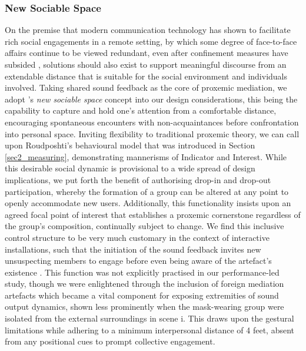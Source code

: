 \subsubsection{New Sociable Space}
On the premise that modern communication technology has shown to facilitate rich social engagements in a remote setting, by which some degree of face-to-face affairs continue to be viewed redundant, even after confinement measures have subsided \citep{cotofan_work_2021}, solutions should also exist to support meaningful discourse from an extendable distance that is suitable for the social environment and individuals involved. Taking shared sound feedback as the core of proxemic mediation, we adopt \citeauthor{mehta_new_2020}'s \citeyear{mehta_new_2020} \textit{new sociable space} concept into our design considerations, this being the capability to capture and hold one's attention from a comfortable distance, encouraging spontaneous encounters with non-acquaintances before confrontation into personal space. Inviting flexibility to traditional proxemic theory, we can call upon Roudposhti's behavioural model that was introduced in Section \ref{sec2_measuring}, demonstrating mannerisms of Indicator and Interest.
While this desirable social dynamic is provisional to a wide spread of design implications, we put forth the benefit of authorising drop-in and drop-out participation, whereby the formation of a group can be altered at any point to openly accommodate new users. Additionally, this functionality insists upon an agreed focal point of interest that establishes a proxemic cornerstone regardless of the group's composition, continually subject to change. We find this inclusive control structure to be very much customary in the context of interactive installations, such that the initiation of the sound feedback invites new unsuspecting members to engage before even being aware of the artefact's existence \citep{goudarzi_engagement_2016,rostami_bio-sensed_2017}. This function was not explicitly practised in our performance-led study, though we were enlightened through the inclusion of foreign mediation artefacts which became a vital component for exposing extremities of sound output dynamics, shown less prominently when the mask-wearing group were isolated from the external surroundings in scene i. This draws upon the gestural limitations while adhering to a minimum interpersonal distance of 4 feet, absent from any positional cues to prompt collective engagement. 

